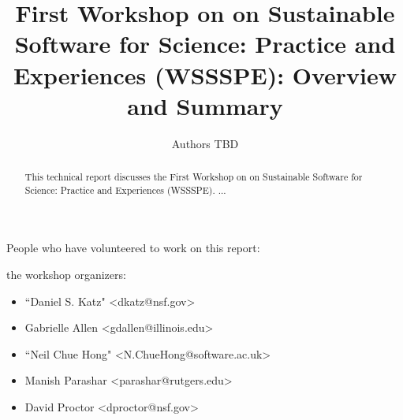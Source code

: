 \documentclass[11pt, oneside]{amsart}
\begin{document}
\title[]{First Workshop on on Sustainable Software for Science: Practice and Experiences (WSSSPE): Overview and Summary}

\author{Authors TBD}

%
%
%
%
%  

    
\begin{abstract}
This technical report discusses the First Workshop on on Sustainable Software for Science: Practice and Experiences (WSSSPE). ...
\end{abstract}




\maketitle

People who have volunteered to work on this report:

the workshop organizers:
\begin{itemize}
\item ``Daniel S. Katz" <dkatz@nsf.gov>
\item Gabrielle Allen <gdallen@illinois.edu>
\item ``Neil Chue Hong" <N.ChueHong@software.ac.uk>
\item Manish Parashar <parashar@rutgers.edu>
\item David Proctor <dproctor@nsf.gov>
\end{itemize}
\end{document}

